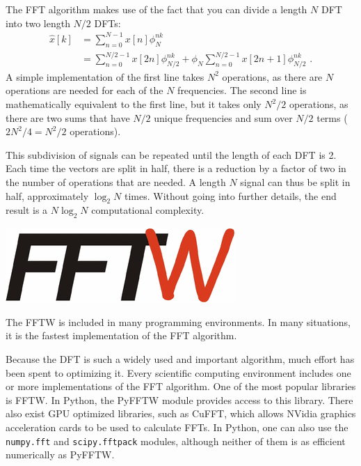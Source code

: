 The FFT algorithm makes use of the fact that you can divide a length
$N$ DFT into two length $N/2$ DFTs:
\begin{align}
  \hat{x}[k] & = \sum_{n=0}^{N-1}x[n]\phi_N^{nk}                                                                  \\
             & =\sum_{n=0}^{N/2-1} x[2n]\phi_{N/2}^{nk} + \phi_{N}\sum_{n=0}^{N/2-1} x[2n+1]\phi_{N/2}^{nk} \,\,.
\end{align}
A simple implementation of the first line takes $N^2$ operations, as
there are $N$ operations are needed for each of the $N$
frequencies. The second line is mathematically equivalent to the first
line, but it takes only $N^2/2$ operations, as there are two sums that
have $N/2$ unique frequencies and sum over $N/2$ terms ($2N^2/4 =
  N^2/2$ operations).

This subdivision of signals can be repeated until the length of each
DFT is 2. Each time the vectors are split in half, there is a
reduction by a factor of two in the number of operations that are
needed. A length $N$ signal can thus be split in half, approximately
$\log_2{N}$ times. Without going into further details, the end result
is a $N\log_2{N}$ computational complexity.%


\begin{marginfigure}
  \begin{center}
    \includegraphics[width=\textwidth]{ch15/figures/fftwlogo.png}
  \end{center}
  \caption{The FFTW is included in many programming environments.
    In many situations, it is the fastest implementation of the FFT algorithm.}
\end{marginfigure}
Because the DFT is such a widely used and important algorithm, much
effort has been spent to optimizing it. Every scientific computing
environment includes one or more implementations of the FFT
algorithm. One of the most popular libraries is FFTW. In Python, the
PyFFTW module provides access to this library. There also exist GPU
optimized libraries, such as CuFFT, which allows NVidia graphics
acceleration cards to be used to calculate FFTs. In Python, one can
also use the \verb|numpy.fft| and \verb|scipy.fftpack| modules,
although neither of them is as efficient numerically as PyFFTW.


